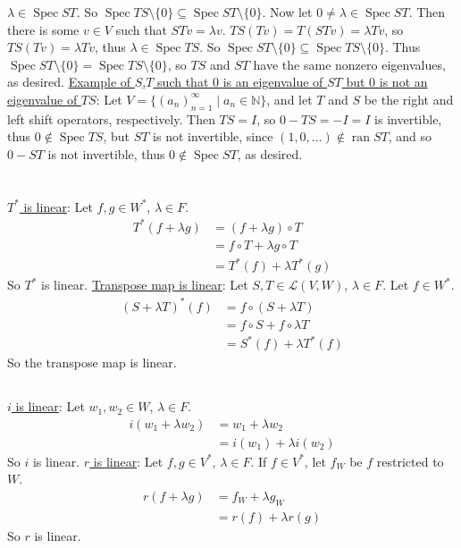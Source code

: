 \documentclass[11pt]{article}
\DeclareMathOperator{\ran}{ran}
\DeclareMathOperator{\spec}{Spec}
\begin{document}
$\lambda\in\spec ST$. So $\spec TS\setminus\{0\}\subseteq\spec ST\setminus\{0\}$.
\newline
\newline
Now let $0\neq\lambda\in\spec ST$. Then there is some $v\in V$ such that
$STv=\lambda v$. $TS(Tv)=T(STv)=\lambda Tv$, so $TS(Tv)=\lambda Tv$, thus
$\lambda\in\spec TS$. So $\spec ST\setminus\{0\}\subseteq\spec TS\setminus\{0\}$.
\newline
\newline
Thus $\spec ST\setminus\{0\}=\spec TS\setminus\{0\}$, so $TS$ and $ST$ have
the same nonzero eigenvalues, as desired.
\newline
\newline
\underline{Example of $S$,$T$ such that 0 is an eigenvalue of $ST$ but 0 is not an eigenvalue of $TS$}:
Let $V=\{(a_n)_{n=1}^\infty\mid a_n\in\mathbb{N}\}$, and let $T$ and $S$ be
the right and left shift operators,  respectively. Then $TS=I$, so $0-TS=-I=I$
is invertible, thus $0\not\in\spec TS$, but $ST$ is not invertible, since
$(1,0,\ldots)\not\in\ran ST$, and so $0-ST$ is not invertible, thus
$0\not\in\spec ST$, as desired.


\section{} %
\underline{$T^*$ is linear}:
Let $f,g\in W^*$, $\lambda\in F$.
\begin{align*}
	T^*(f+\lambda g)&=(f+\lambda g)\circ T\\
	&=f\circ T+\lambda g\circ T\\
	&=T^*(f)+\lambda T^*(g)
\end{align*}
So $T^*$ is linear.
\newline
\newline
\underline{Transpose map is linear}:
Let $S,T\in\mathcal{L}(V,W)$, $\lambda\in F$. Let $f\in W^*$.
\begin{align*}
	(S+\lambda T)^*(f)&=f\circ(S+\lambda T)\\
	&=f\circ S+f\circ\lambda T\\
	&=S^*(f)+\lambda T^*(f)
\end{align*}
So the transpose map is linear.


\subsection{} %
\underline{$i$ is linear}:
Let $w_1,w_2\in W$, $\lambda\in F$.
\begin{align*}
	i(w_1+\lambda w_2)&=w_1+\lambda w_2\\
	&=i(w_1)+\lambda i(w_2)
\end{align*}
So $i$ is linear.
\newline
\newline
\underline{$r$ is linear}:
Let $f,g\in V^*$, $\lambda\in F$. If $f\in V^*$, let $f_W$ be $f$ restricted
to $W$.
\begin{align*}
	r(f+\lambda g)&=f_W+\lambda g_W\\
	&=r(f)+\lambda r(g)
\end{align*}
So $r$ is linear.
\end{document}
